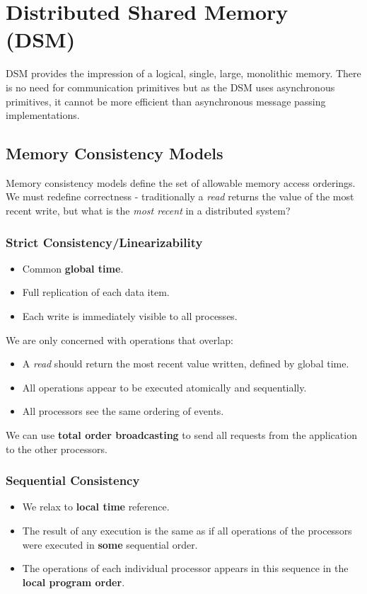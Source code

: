 \documentclass[11pt]{article}
\begin{document}
\section{Distributed Shared Memory (DSM)}
DSM provides the impression of a logical, single, large, monolithic memory.
There is no need for communication primitives but as the DSM uses asynchronous primitives, it cannot be more efficient than asynchronous message passing implementations.

\subsection{Memory Consistency Models}
Memory consistency models define the set of allowable memory access orderings.
We must redefine correctness - traditionally a \textit{read} returns the value of the most recent write, but what is the \textit{most recent} in a distributed system?

\subsubsection{Strict Consistency/Linearizability}
\begin{itemize}
  \item Common \textbf{global time}.
  \item Full replication of each data item.
  \item Each write is immediately visible to all processes.
\end{itemize}

We are only concerned with operations that overlap:
\begin{itemize}
  \item A \textit{read} should return the most recent value written, defined by global time.
  \item All operations appear to be executed atomically and sequentially.
  \item All processors see the same ordering of events.
\end{itemize}

We can use \textbf{total order broadcasting} to send all requests from the application to the other processors.

\subsubsection{Sequential Consistency}
\begin{itemize}
  \item We relax to \textbf{local time} reference.
  \item The result of any execution is the same as if all operations of the processors were executed in \textbf{some} sequential order.
  \item The operations of each individual processor appears in this sequence in the \textbf{local program order}.
\end{itemize}
\end{document}
